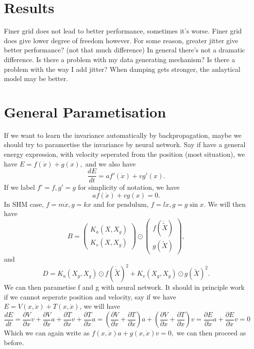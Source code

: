 \documentclass{article}
\begin{document}
\section*{Results}
Finer grid does not lead to better performance, sometimes it's worse.
Finer grid does give lower degree of freedom however.
For some reason, greater jitter give better performance? (not that much difference)
In general there's not a dramatic difference.
Is there a problem with my data generating mechanism?
Is there a problem with the way I add jitter?
When damping gets stronger, the anlaytical model may be better. 
\section*{General Parametisation}
If we want to learn the invariance automatically by backpropagation, maybe we should try to paramertise the invariance by neural network.
Say if have a general energy expression, with velocity seperated from the position (most situation), we have $E=f(\dot{x})+g(x),$ and we also have
$$
\frac{dE}{dt} = af'(\dot{x}) + vg'(x). 
$$
If we label $f'=f, g'=g$ for simplicity of notation, we have 
$$
af(\dot{x})+vg(x)=0.
$$
In SHM case, $f=m\dot{x}, g=kx$ and for pendulum, $f=l\dot{x}, g=g\sin x$.
We will then have 
$$
B = \begin{pmatrix}
  K_a(X, X_g) \\ K_v(X, X_g) \end{pmatrix}
  \odot \begin{pmatrix}
    f(\dot{\tilde{X}}) \\ g(\tilde{X})
  \end{pmatrix}, 
$$
and 
$$
D = K_a(X_g, X_g) \odot f(\dot{\tilde{X}})^2 + K_v(X_g, X_g) \odot g(\tilde{X})^2.
$$
We can then parametise f and g with neural network.
It should in principle work if we cannot seperate position and velocity, say if we have $E=V(x, \dot{x})+T(x, \dot{x})$, we will have $$\frac{dE}{dt} = \frac{\partial V}{\partial x}v+\frac{\partial V}{\partial \dot{x}}a+\frac{\partial T}{\partial x}v+\frac{\partial T}{\partial \dot{x}}a=(\frac{\partial V}{\partial \dot{x}}+\frac{\partial T}{\partial \dot{x}})a+(\frac{\partial V}{\partial x}+\frac{\partial T}{\partial x})v=\frac{\partial E}{\partial \dot{x}}a+\frac{\partial E}{\partial x}v=0$$
Which we can again write as $f(x, \dot{x})a+g(x, \dot{x})v=0,$ we can then proceed as before.
\end{document}
